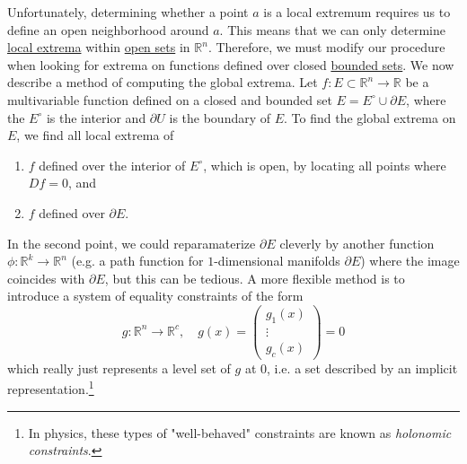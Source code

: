   Unfortunately, determining whether a point $a$ is a local extremum requires us to define an open neighborhood around $a$. This means that we can only determine \hyperref[pst-def:local_extrema]{local extrema} within \hyperref[pst-def:open-set]{open sets} in $\mathbb{R}^n$. Therefore, we must modify our procedure when looking for extrema on functions defined over closed \hyperref[pst-def:bounded-set]{bounded sets}. We now describe a method of computing the global extrema. Let $f: E \subset \mathbb{R}^n \to \mathbb{R}$ be a multivariable function defined on a closed and bounded set $E = E^\circ \cup \partial E$, where the $E^\circ$ is the interior and $\partial U$ is the boundary of $E$. To find the global extrema on $E$, we find all local extrema of 
  \begin{enumerate}
		\item $f$ defined over the interior of $E^\circ$, which is open, by locating all points where $D f = 0$, and 
		\item $f$ defined over $\partial E$.
  \end{enumerate}
	In the second point, we could reparamaterize $\partial E$ cleverly by another function $\phi: \mathbb{R}^k \to \mathbb{R}^n$ (e.g. a path function for $1$-dimensional manifolds $\partial E$) where the image coincides with $\partial E$, but this can be tedious. A more flexible method is to introduce a system of equality constraints of the form 
	\begin{equation}
	  g: \mathbb{R}^n \to \mathbb{R}^c, \quad g(x) = \begin{pmatrix}
	    g_1 (x) \\ \vdots \\ g_c (x) 
	  \end{pmatrix} = 0
	\end{equation}
	which really just represents a level set of $g$ at $0$, i.e. a set described by an implicit representation.\footnote{In physics, these types of "well-behaved" constraints are known as \textit{holonomic constraints}.}

